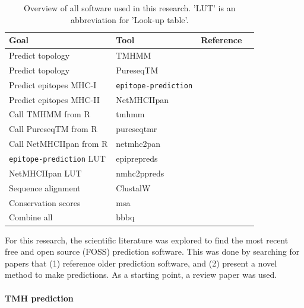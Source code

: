 \begin{table}[]
  \begin{tabular}{llll}
    Goal & Tool & Reference \\ 
    \hline
    Predict topology                  & TMHMM                     & \cite{krogh2001predicting} \\
    Predict topology                  & PureseqTM                 & \cite{wang2019efficient} \\
    Predict epitopes MHC-I            & \verb;epitope-prediction; & \cite{bianchi2017} \\
    Predict epitopes MHC-II           & NetMHCIIpan               & \cite{nielsen2008quantitative,karosiene2013netmhciipan} \\
    Call TMHMM from R                 & tmhmm                     & \cite{tmhmm} \\
    Call PureseqTM from R             & pureseqtmr                & \cite{pureseqtmr} \\
    Call NetMHCIIpan from R           & netmhc2pan                & \cite{netmhc2pan} \\
    \verb;epitope-prediction; LUT     & epiprepreds               & \cite{epiprepreds} \\
    NetMHCIIpan LUT                   & nmhc2ppreds               & \cite{nmhc2ppreds} \\
    Sequence alignment                & ClustalW                  & \cite{thompson1994clustal} \\
    Conservation scores               & msa                       & \cite{bodenhofer2015msa} \\
    Combine all                       & bbbq                      & \cite{bbbq}
  \end{tabular}
  \caption{
    Overview of all software used in this research.
    'LUT' is an abbreviation for 'Look-up table'. 
  }
  \label{table:software_used}
\end{table}

For this research, the scientific literature was explored 
to find the most recent free and open source (FOSS) prediction software.
This was done by searching for papers that (1) reference older
prediction software, and (2) present a novel method to make predictions.
As a starting point, a review paper was used.

\paragraph{TMH prediction}


